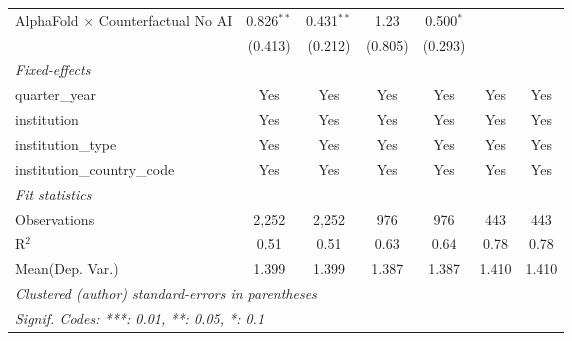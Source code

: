 \begin{tabular}{lcccccc}
   AlphaFold $\times$ Counterfactual No AI  & 0.826$^{**}$ & 0.431$^{**}$ & 1.23    & 0.500$^{*}$ &         &   \\   
                                            & (0.413)      & (0.212)      & (0.805) & (0.293)     &         &   \\   
   \midrule
   \emph{Fixed-effects}\\
   quarter\_year                            & Yes          & Yes          & Yes     & Yes         & Yes     & Yes\\  
   institution                              & Yes          & Yes          & Yes     & Yes         & Yes     & Yes\\  
   institution\_type                        & Yes          & Yes          & Yes     & Yes         & Yes     & Yes\\  
   institution\_country\_code               & Yes          & Yes          & Yes     & Yes         & Yes     & Yes\\  
   \midrule
   \emph{Fit statistics}\\
   Observations                             & 2,252        & 2,252        & 976     & 976         & 443     & 443\\  
   R$^2$                                    & 0.51         & 0.51         & 0.63    & 0.64        & 0.78    & 0.78\\  
Mean(Dep. Var.) & 1.399 & 1.399 & 1.387 & 1.387 & 1.410 & 1.410 \\
   \midrule \midrule
   \multicolumn{7}{l}{\emph{Clustered (author) standard-errors in parentheses}}\\
   \multicolumn{7}{l}{\emph{Signif. Codes: ***: 0.01, **: 0.05, *: 0.1}}\\
\end{tabular}
\par\endgroup
